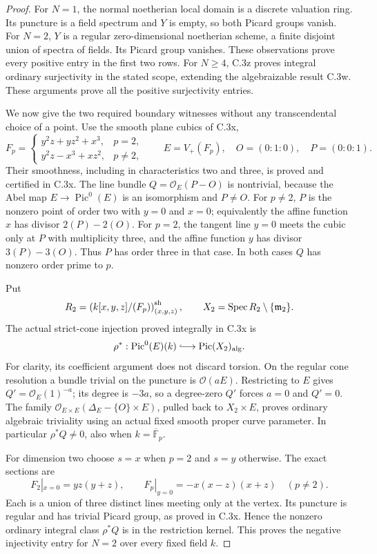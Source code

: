 \begin{proof}
For $N=1$, the normal noetherian local domain is a discrete valuation
ring. Its puncture is a field spectrum and $Y$ is empty, so both
Picard groups vanish. For $N=2$, $Y$ is a regular zero-dimensional
noetherian scheme, a finite disjoint union of spectra of fields.
Its Picard group vanishes. These observations prove every positive
entry in the first two rows. For $N\ge4$, C.3z proves integral
ordinary surjectivity in the stated scope, extending the
algebraizable result C.3w. These arguments prove all the positive
surjectivity entries.

We now give the two required boundary witnesses without any
transcendental choice of a point. Use the smooth plane cubics of
C.3x,
\[
 F_p=
 \begin{cases}
 y^2z+yz^2+x^3,&p=2,\\
 y^2z-x^3+xz^2,&p\ne2,
 \end{cases}
 \qquad E=V_+(F_p),\quad O=(0:1:0),\quad P=(0:0:1).
\]
Their smoothness, including in characteristics two and three, is
proved and certified in C.3x. The line bundle
$Q=\mathcal O_E(P-O)$ is nontrivial, because the Abel map
$E\to\operatorname{Pic}^0(E)$ is an isomorphism and $P\ne O$.
For $p\ne2$, $P$ is the nonzero point of order two with $y=0$ and
$x=0$; equivalently the affine function $x$ has divisor
$2(P)-2(O)$. For $p=2$, the tangent line $y=0$ meets the cubic
only at $P$ with multiplicity three, and the affine function $y$
has divisor $3(P)-3(O)$. Thus $P$ has order three in that case.
In both cases $Q$ has nonzero order prime to $p$.

Put
\[
 R_2=\left(k[x,y,z]/(F_p)\right)_{(x,y,z)}^{\rm sh},
 \qquad X_2=\operatorname{Spec}R_2\setminus\{\mathfrak m_2\}.
\]
The actual strict-cone injection proved integrally in C.3x is
\[
 \rho^*:\operatorname{Pic}^0(E)(k)
       \lhook\joinrel\longrightarrow\operatorname{Pic}(X_2)_{\rm alg}.
\]
For clarity, its coefficient argument does not discard torsion.
On the regular cone resolution a bundle trivial on the puncture is
$\mathcal O(aE)$. Restricting to $E$ gives $Q'=\mathcal O_E(1)^{-a}$;
its degree is $-3a$, so a degree-zero $Q'$ forces $a=0$ and $Q'=0$.
The family
$\mathcal O_{E\times E}(\Delta_E-\{O\}\times E)$, pulled back
to $X_2\times E$, proves ordinary algebraic triviality using an
actual fixed smooth proper curve parameter. In particular
$\rho^*Q\ne0$, also when $k=\overline{\mathbb F}_p$.

For dimension two choose $s=x$ when $p=2$ and $s=y$ otherwise.
The exact sections are
\[
 F_2|_{x=0}=yz(y+z),\qquad
 F_p|_{y=0}=-x(x-z)(x+z)\quad(p\ne2).
\]
Each is a union of three distinct lines meeting only at the vertex.
Its puncture is regular and has trivial Picard group, as proved
in C.3x. Hence the nonzero ordinary integral class $\rho^*Q$ is
in the restriction kernel. This proves the negative injectivity
entry for $N=2$ over every fixed field $k$.


\end{proof}
